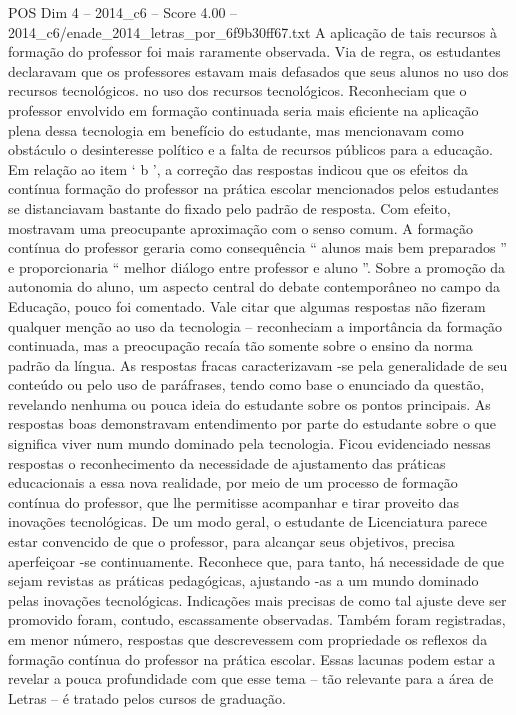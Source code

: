 \begin{textsample}{POS Dim 4 – 2014\_c6 – Score 4.00 – 2014\_c6/enade\_2014\_letras\_por\_6f9b30ff67.txt}
A aplicação de tais recursos à formação do professor foi mais raramente observada.
Via de regra, os estudantes declaravam que os professores estavam mais defasados que seus alunos no uso dos recursos tecnológicos. no uso dos recursos tecnológicos.
Reconheciam que o professor envolvido em formação continuada seria mais eficiente na aplicação plena dessa tecnologia em benefício do estudante, mas mencionavam como obstáculo o desinteresse político e a falta de recursos públicos para a educação.
Em relação ao item ‘ b ’, a correção das respostas indicou que os efeitos da contínua formação do professor na prática escolar mencionados pelos estudantes se distanciavam bastante do fixado pelo padrão de resposta.
Com efeito, mostravam uma preocupante aproximação com o senso comum.
A formação contínua do professor geraria como consequência “ alunos mais bem preparados ” e proporcionaria “ melhor diálogo entre professor e aluno ”.
Sobre a promoção da autonomia do aluno, um aspecto central do debate contemporâneo no campo da Educação, pouco foi comentado.
Vale citar que algumas respostas não fizeram qualquer menção ao uso da tecnologia – reconheciam a importância da formação continuada, mas a preocupação recaía tão somente sobre o ensino da norma padrão da língua.
As respostas fracas caracterizavam -se pela generalidade de seu conteúdo ou pelo uso de paráfrases, tendo como base o enunciado da questão, revelando nenhuma ou pouca ideia do estudante sobre os pontos principais.
As respostas boas demonstravam entendimento por parte do estudante sobre o que significa viver num mundo dominado pela tecnologia.
Ficou evidenciado nessas respostas o reconhecimento da necessidade de ajustamento das práticas educacionais a essa nova realidade, por meio de um processo de formação contínua do professor, que lhe permitisse acompanhar e tirar proveito das inovações tecnológicas.
De um modo geral, o estudante de Licenciatura parece estar convencido de que o professor, para alcançar seus objetivos, precisa aperfeiçoar -se continuamente.
Reconhece que, para tanto, há necessidade de que sejam revistas as práticas pedagógicas, ajustando -as a um mundo dominado pelas inovações tecnológicas.
Indicações mais precisas de como tal ajuste deve ser promovido foram, contudo, escassamente observadas.
Também foram registradas, em menor número, respostas que descrevessem com propriedade os reflexos da formação contínua do professor na prática escolar.
Essas lacunas podem estar a revelar a pouca profundidade com que esse tema – tão relevante para a área de Letras – é tratado pelos cursos de graduação.

\end{textsample}
